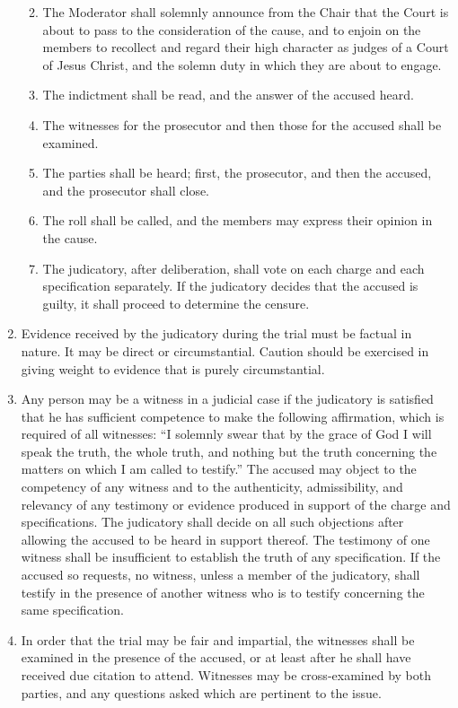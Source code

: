 \documentclass[
]{book}
\providecommand{\tightlist}{%
  \setlength{\itemsep}{0pt}\setlength{\parskip}{0pt}}
\begin{document}
\begin{enumerate}
  \begin{enumerate}
  \def\labelenumii{\alph{enumii}.}
  \tightlist
  \item
    The Moderator shall solemnly announce from the Chair that the Court is about to pass to the consideration of the cause, and to enjoin on the members to recollect and regard their high character as judges of a Court of Jesus Christ, and the solemn duty in which they are about to engage.
  \item
    The indictment shall be read, and the answer of the accused heard.
  \item
    The witnesses for the prosecutor and then those for the accused shall be examined.
  \item
    The parties shall be heard; first, the prosecutor, and then the accused, and the prosecutor shall close.
  \item
    The roll shall be called, and the members may express their opinion in the cause.
  \item
    The judicatory, after deliberation, shall vote on each charge and each specification separately. If the judicatory decides that the accused is guilty, it shall proceed to determine the censure.
  \end{enumerate}
\item
  Evidence received by the judicatory during the trial must be factual in nature. It may be direct or circumstantial. Caution should be exercised in giving weight to evidence that is purely circumstantial.
\item
  Any person may be a witness in a judicial case if the judicatory is satisfied that he has sufficient competence to make the following affirmation, which is required of all witnesses: ``I solemnly swear that by the grace of God I will speak the truth, the whole truth, and nothing but the truth concerning the matters on which I am called to testify.'' The accused may object to the competency of any witness and to the authenticity, admissibility, and relevancy of any testimony or evidence produced in support of the charge and specifications. The judicatory shall decide on all such objections after allowing the accused to be heard in support thereof. The testimony of one witness shall be insufficient to establish the truth of any specification. If the accused so requests, no witness, unless a member of the judicatory, shall testify in the presence of another witness who is to testify concerning the same specification.
\item
  In order that the trial may be fair and impartial, the witnesses shall be examined in the presence of the accused, or at least after he shall have received due citation to attend. Witnesses may be cross-examined by both parties, and any questions asked which are pertinent to the issue.

\end{enumerate}
\end{document}
